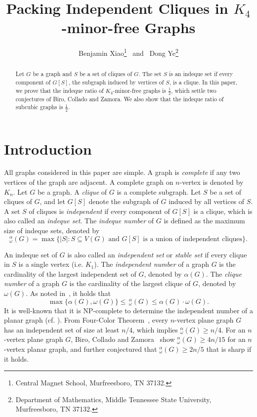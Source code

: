 \documentclass{article}
\title{Packing Independent Cliques in $K_4$-minor-free Graphs %
}
\author{Benjamin Xiao\thanks{Central Magnet School, Murfreesboro, TN 37132.} \ and \  Dong Ye\thanks{Department of Mathematics, Middle Tennessee State University, Murfreesboro, TN 37132.} }
\date{}
\newcommand{\idq}{{}^{\alpha}_{\omega}}
\begin{document}
\maketitle

\begin{abstract}
Let $G$ be a graph and $S$ be a set of cliques of $G$. The set $S$ is an indeque set if every component of $G[S]$, the subgraph induced by vertices of $S$, is a clique. In this paper, we prove that the indeque ratio of $K_4$-minor-free graphs is $\frac 1 2$, which settle two conjectures of Biro, Collado and Zamora. %
We also show that the indeque ratio of subcubic graphs is $\frac 1 2$. 
\end{abstract}
  
 
\section{Introduction}
All graphs considered in this paper are simple. A graph is {\em complete} if any two vertices of the graph are adjacent. A complete graph on $n$-vertex is denoted by $K_n$. 
 Let $G$ be a graph. A {\em clique} of $G$ is a complete subgraph. Let $S$ be a set of cliques of $G$, and let $G[S]$ denote the subgraph of $G$ induced by all vertices of $S$. 
A set $S$ of cliques is {\em independent} if every component of $G[S]$ is a clique, which is also called an {\em indeque set}. The {\em indeque number} of $G$ is defined as the maximum size of indeque sets, denoted by
\[\idq(G)= \max\{|S| : S\subseteq V (G) \mbox{ and } G[S]\mbox{ is a union of independent cliques}\}.\]


An indeque set of $G$ is also called an {\em independent set} or {\em stable set} if every clique in $S$ is a single vertex (i.e. $K_1$). The {\em independent number} of a graph $G$ is the cardinality of the largest independent set of $G$, denoted by $\alpha(G)$. The {\em clique number} of a graph $G$ is the cardinality of the largest clique of $G$, denoted by $\omega(G)$. As noted in~\cite{BCZ}, it holds that 
\[\max\{\alpha(G), \omega(G)\}\le\, \idq(G)\le \alpha(G)\cdot \omega(G).\] 
It is well-known that it is NP-complete to determine the  independent number of a planar graph (cf. \cite{AHU}). From Four-Color Theorem~\cite{RT}, every $n$-vertex plane graph $G$ has an independent set of size at least $n/4$, which implies $\idq(G)\ge n/4$. %
For an $n$-vertex plane graph $G$, Biro, Collado and Zamora~\cite{BCZ} show $\idq(G) \ge 4n/15$ for an $n$-vertex planar graph, and further conjectured that $\idq(G)\ge 2n/5$ that is sharp if it holds. 
\end{document}
